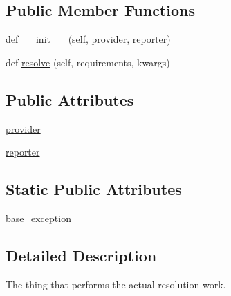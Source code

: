 \subsection*{Public Member Functions}
\begin{DoxyCompactItemize}
\item 
def \hyperlink{classpip_1_1__vendor_1_1resolvelib_1_1providers_1_1AbstractResolver_a245fecc5104f8b430e2d78327cb0de62}{\+\_\+\+\_\+init\+\_\+\+\_\+} (self, \hyperlink{classpip_1_1__vendor_1_1resolvelib_1_1providers_1_1AbstractResolver_a149d96dde7301b4b17321db453730ca1}{provider}, \hyperlink{classpip_1_1__vendor_1_1resolvelib_1_1providers_1_1AbstractResolver_a73fb1c2ece138e2b6af9c424118e24d2}{reporter})
\item 
def \hyperlink{classpip_1_1__vendor_1_1resolvelib_1_1providers_1_1AbstractResolver_add6fb3eb530eb740edcd426f264d8051}{resolve} (self, requirements, kwargs)
\end{DoxyCompactItemize}
\subsection*{Public Attributes}
\begin{DoxyCompactItemize}
\item 
\hyperlink{classpip_1_1__vendor_1_1resolvelib_1_1providers_1_1AbstractResolver_a149d96dde7301b4b17321db453730ca1}{provider}
\item 
\hyperlink{classpip_1_1__vendor_1_1resolvelib_1_1providers_1_1AbstractResolver_a73fb1c2ece138e2b6af9c424118e24d2}{reporter}
\end{DoxyCompactItemize}
\subsection*{Static Public Attributes}
\begin{DoxyCompactItemize}
\item 
\hyperlink{classpip_1_1__vendor_1_1resolvelib_1_1providers_1_1AbstractResolver_a3dc432d83712f4740860340a815715f7}{base\+\_\+exception}
\end{DoxyCompactItemize}


\subsection{Detailed Description}
\begin{DoxyVerb}The thing that performs the actual resolution work.\end{DoxyVerb}
 

